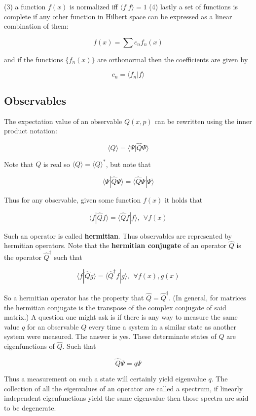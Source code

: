 \documentclass[a4paper]{article}
\begin{document}
(3) a function $f(x)$ is normalized iff $\langle f | f \rangle=1$ (4) lastly a set of functions is complete if any other function in Hilbert space can be expressed as a linear combination of them:

\begin{equation}
	f(x)=\sum c_nf_n(x)
\end{equation}

and if the functions $\{f_n(x)\}$ are orthonormal then the coefficients are given by

\begin{equation}
	c_n=\langle f_n|f\rangle
\end{equation}

\subsection{Observables}

The expectation value of an observable $Q(x,p)$ can be rewritten using the inner product notation:

\begin{equation}
	\langle Q \rangle=\langle \Psi | \hat{Q}\Psi \rangle
\end{equation}

Note that $Q$ is real so $\langle Q \rangle=\langle Q \rangle^*$, but note that

\begin{equation}
	\langle \Psi | \hat{Q}\Psi \rangle=\langle \hat{Q}\Psi | \Psi \rangle
\end{equation}

Thus for any observable, given some function $f(x)$ it holds that

\begin{equation}
	\langle f | \hat{Q}f \rangle=\langle \hat{Q}f | f \rangle, \ \ \forall f(x)
\end{equation}

Such an operator is called \textbf{hermitian}. Thus observables are represented by hermitian operators. Note that the \textbf{hermitian conjugate} of an operator $\hat{Q}$ is the operator $\hat{Q}^\dagger$ such that

\begin{equation}
	\langle f | \hat{Q}g \rangle=\langle \hat{Q}^\dagger f | g \rangle, \ \ \forall f(x),g(x)
\end{equation}

So a hermitian operator has the property that $\hat{Q}=\hat{Q}^\dagger$. (In general, for matrices the hermitian conjugate is the transpose of the complex conjugate of said matrix.) A question one might ask is if there is any way to measure the same value $q$ for an observable $Q$ every time a system in a similar state as another system were measured. The answer is yes. These determinate states of $Q$ are eigenfunctions of $\hat{Q}$. Such that

\begin{equation}
	\hat{Q}\Psi=q\Psi
\end{equation}

Thus a measurement on such a state will certainly yield eigenvalue $q$. The collection of all the eigenvalues of an operator are called a spectrum, if linearly independent eigenfunctions yield the same eigenvalue then those spectra are said to be degenerate.
\end{document}
